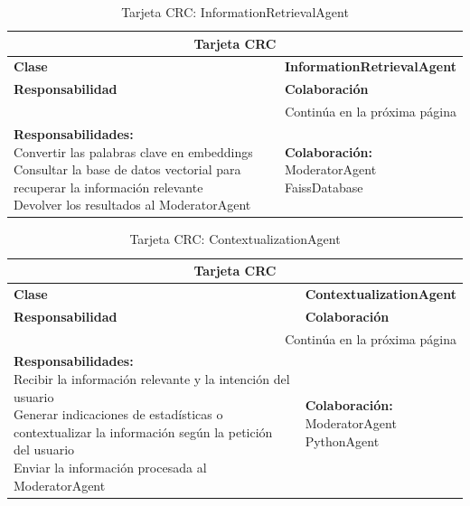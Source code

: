 \begin{longtable}{|l|l|}
	\caption{Tarjeta CRC: InformationRetrievalAgent} \label{tablacrc2} \\
	
	\hline
	\multicolumn{2}{|c|}{\textbf{Tarjeta CRC}} \\
	\hline
	\textbf{Clase} & \textbf{InformationRetrievalAgent} \\
	\hline
	\endfirsthead
	
	\hline
	\textbf{Responsabilidad} & \textbf{Colaboración} \\
	\hline
	\endhead
	
	\hline
	\multicolumn{2}{|r|}{Continúa en la próxima página} \\
	\hline
	\endfoot
	
	\hline
	\endlastfoot
	
	\parbox[t]{0.45\linewidth}{\textbf{Responsabilidades:} \\ 
		Convertir las palabras clave en embeddings \\ 
		Consultar la base de datos vectorial para recuperar la información relevante \\ 
		Devolver los resultados al ModeratorAgent} 
	& 
	\parbox[t]{0.45\linewidth}{\textbf{Colaboración:} \\
		ModeratorAgent \\ 
		FaissDatabase}
\end{longtable}

\begin{longtable}{|l|l|}
	\caption{Tarjeta CRC: ContextualizationAgent} \label{tablacrc3} \\
	
	\hline
	\multicolumn{2}{|c|}{\textbf{Tarjeta CRC}} \\
	\hline
	\textbf{Clase} & \textbf{ContextualizationAgent} \\
	\hline
	\endfirsthead
	
	\hline
	\textbf{Responsabilidad} & \textbf{Colaboración} \\
	\hline
	\endhead
	
	\hline
	\multicolumn{2}{|r|}{Continúa en la próxima página} \\
	\hline
	\endfoot
	
	\hline
	\endlastfoot
	
	\parbox[t]{0.45\linewidth}{\textbf{Responsabilidades:} \\ 
		Recibir la información relevante y la intención del usuario \\ 
		Generar indicaciones de estadísticas o contextualizar la información según la petición del usuario \\ 
		Enviar la información procesada al ModeratorAgent} 
	& 
	\parbox[t]{0.45\linewidth}{\textbf{Colaboración:} \\
		ModeratorAgent \\ 
		PythonAgent}
\end{longtable}


